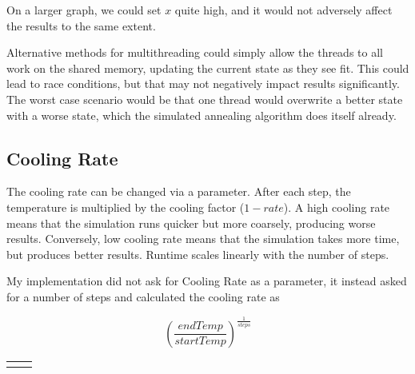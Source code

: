 \documentclass[a4paper, 11pt,table]{article}
\begin{document}
	On a larger graph, we could set $x$ quite high, and it would not adversely affect the results to the same extent.
	
	Alternative methods for multithreading could simply allow the threads to all work on the shared memory, updating the current state as they see fit. This could lead to race conditions, but that may not negatively impact results significantly. The worst case scenario would be that one thread would overwrite a better state with a worse state, which the simulated annealing algorithm does itself already.
	
	\subsection{Cooling Rate}
	The cooling rate can be changed via a parameter. After each step, the temperature is multiplied by the cooling factor ($1-rate$). A high cooling rate means that the simulation runs quicker but more coarsely, producing worse results. Conversely, low cooling rate means that the simulation takes more time, but produces better results. Runtime scales linearly with the number of steps.
	
	My implementation did not ask for Cooling Rate as a parameter, it instead asked for a number of steps and calculated the cooling rate as
	
	\begin{equation}
	\left({\frac{endTemp}{startTemp}}\right)^{\frac{1}{steps}}
	\end{equation}
	
	\begin{tabu}{X[c] X[c]}
		&
	\end{tabu}
	
\end{document}
